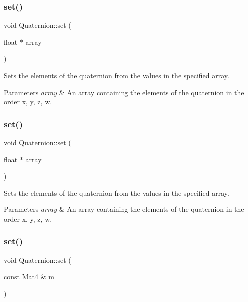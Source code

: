 \subsubsection{\texorpdfstring{set()}{set()}\hspace{0.1cm}{\footnotesize\ttfamily [3/10]}}
{\footnotesize\ttfamily void Quaternion\+::set (\begin{DoxyParamCaption}\item[{float $\ast$}]{array }\end{DoxyParamCaption})}

Sets the elements of the quaternion from the values in the specified array.


\begin{DoxyParams}{Parameters}
{\em array} & An array containing the elements of the quaternion in the order x, y, z, w. \\
\hline
\end{DoxyParams}
\mbox{\label{classQuaternion_aaf18a418dc62bf348e7629e4875da050}} 
\subsubsection{\texorpdfstring{set()}{set()}\hspace{0.1cm}{\footnotesize\ttfamily [4/10]}}
{\footnotesize\ttfamily void Quaternion\+::set (\begin{DoxyParamCaption}\item[{float $\ast$}]{array }\end{DoxyParamCaption})}

Sets the elements of the quaternion from the values in the specified array.


\begin{DoxyParams}{Parameters}
{\em array} & An array containing the elements of the quaternion in the order x, y, z, w. \\
\hline
\end{DoxyParams}
\mbox{\label{classQuaternion_ae51fe27416ac31583a4442cc0b8b2252}} 
\subsubsection{\texorpdfstring{set()}{set()}\hspace{0.1cm}{\footnotesize\ttfamily [5/10]}}
{\footnotesize\ttfamily void Quaternion\+::set (\begin{DoxyParamCaption}\item[{const \hyperlink{classMat4}{Mat4} \&}]{m }\end{DoxyParamCaption})}

